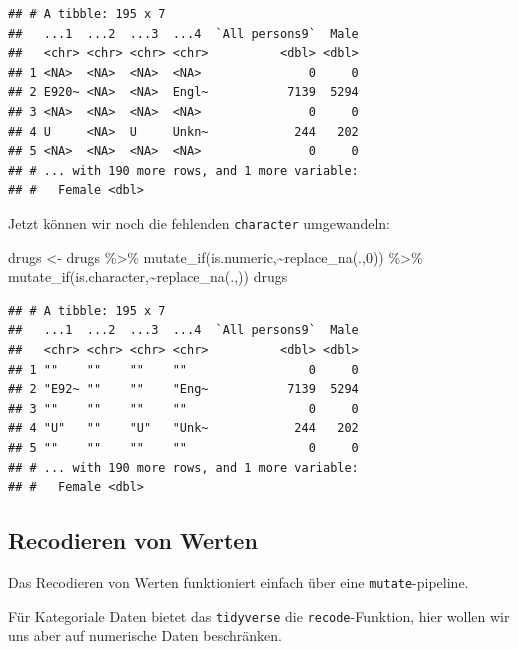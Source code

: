 \documentclass[
]{book}
\newenvironment{Shaded}{\begin{snugshade}}{\end{snugshade}}
\newcommand{\DecValTok}[1]{\textcolor[rgb]{0.00,0.00,0.81}{#1}}
\newcommand{\FunctionTok}[1]{\textcolor[rgb]{0.00,0.00,0.00}{#1}}
\newcommand{\NormalTok}[1]{#1}
\newcommand{\OtherTok}[1]{\textcolor[rgb]{0.56,0.35,0.01}{#1}}
\newcommand{\SpecialCharTok}[1]{\textcolor[rgb]{0.00,0.00,0.00}{#1}}
\newcommand{\StringTok}[1]{\textcolor[rgb]{0.31,0.60,0.02}{#1}}
\begin{document}
\begin{verbatim}
## # A tibble: 195 x 7
##   ...1  ...2  ...3  ...4  `All persons9`  Male
##   <chr> <chr> <chr> <chr>          <dbl> <dbl>
## 1 <NA>  <NA>  <NA>  <NA>               0     0
## 2 E920~ <NA>  <NA>  Engl~           7139  5294
## 3 <NA>  <NA>  <NA>  <NA>               0     0
## 4 U     <NA>  U     Unkn~            244   202
## 5 <NA>  <NA>  <NA>  <NA>               0     0
## # ... with 190 more rows, and 1 more variable:
## #   Female <dbl>
\end{verbatim}

Jetzt können wir noch die fehlenden \texttt{character} umgewandeln:

\begin{Shaded}
\begin{Highlighting}[]
\NormalTok{drugs }\OtherTok{\textless{}{-}}\NormalTok{ drugs }\SpecialCharTok{\%\textgreater{}\%} 
  \FunctionTok{mutate\_if}\NormalTok{(is.numeric,}\SpecialCharTok{\textasciitilde{}}\FunctionTok{replace\_na}\NormalTok{(.,}\DecValTok{0}\NormalTok{)) }\SpecialCharTok{\%\textgreater{}\%} 
  \FunctionTok{mutate\_if}\NormalTok{(is.character,}\SpecialCharTok{\textasciitilde{}}\FunctionTok{replace\_na}\NormalTok{(.,}\StringTok{\textquotesingle{}\textquotesingle{}}\NormalTok{))}
\NormalTok{drugs}
\end{Highlighting}
\end{Shaded}

\begin{verbatim}
## # A tibble: 195 x 7
##   ...1  ...2  ...3  ...4  `All persons9`  Male
##   <chr> <chr> <chr> <chr>          <dbl> <dbl>
## 1 ""    ""    ""    ""                 0     0
## 2 "E92~ ""    ""    "Eng~           7139  5294
## 3 ""    ""    ""    ""                 0     0
## 4 "U"   ""    "U"   "Unk~            244   202
## 5 ""    ""    ""    ""                 0     0
## # ... with 190 more rows, and 1 more variable:
## #   Female <dbl>
\end{verbatim}

\hypertarget{recodieren-von-werten}{%
\subsection{Recodieren von Werten}\label{recodieren-von-werten}}

Das Recodieren von Werten funktioniert einfach über eine \texttt{mutate}-pipeline.

Für Kategoriale Daten bietet das \texttt{tidyverse} die \texttt{recode}-Funktion, hier wollen wir uns aber auf numerische Daten beschränken.
\end{document}
